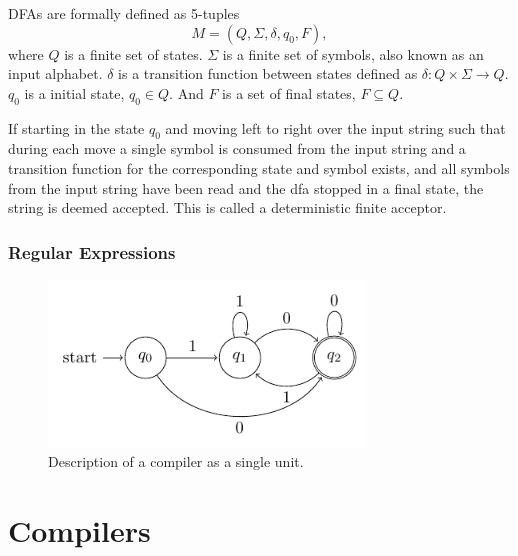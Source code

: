 \begin{definition}
\label{def:dfa}
DFAs are formally defined as 5-tuples
$$ M = (Q, \Sigma, \delta, q_0, F),$$
where
$Q$ is a finite set of states. $\Sigma$ is a finite set of symbols, also known as an input alphabet. $\delta$ is a transition function between states defined as $\delta : Q \times \Sigma \rightarrow Q$. $q_0$ is a initial state, $q_0 \in Q$. And $F$ is a set of final states, $F \subseteq Q$.

If starting in the state $q_0$ and moving left to right over the input string such that during each move a single symbol is consumed from the input string and a transition function for the corresponding state and symbol exists, and all symbols from the input string have been read and the \gls{dfa} stopped in a final state, the string is deemed accepted. This is called a deterministic finite acceptor.
\end{definition}


\subsubsection{Regular Expressions} 

\begin{definition}
  \label{def:regular_exp}
\end{definition}






\begin{figure}[H]
  \label{fig:dfa}
  \centering
  \includegraphics[width=0.75\textwidth]{figures/dfa.pdf}
  \caption{Description of a compiler as a single unit.}
\end{figure}



  


\section{Compilers}


